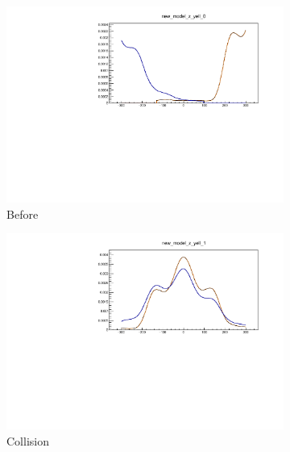 \begin{figure}[ht]
  \centering
  \begin{subfigure}{0.7\linewidth}
    \includegraphics[width=\textwidth]{./figures/359711_time_step_0_bunch_collision.pdf}
    \caption{Before}
  \end{subfigure}
  \begin{subfigure}{0.7\linewidth}
    \includegraphics[width=\textwidth]{./figures/359711_time_step_1_bunch_collision.pdf}
    \caption{Collision}
  \end{subfigure}
  \begin{subfigure}{0.7\linewidth}

\end{subfigure}
\end{figure}
